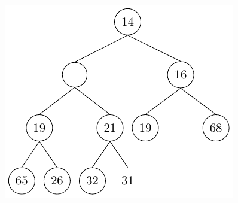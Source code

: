 \begin{center}
\begin{minipage}{0.32\textwidth}
\begin{figure}[H]
\end{figure}
\end{minipage}
\begin{minipage}{0.32\textwidth}
\begin{figure}[H]
  \centering
  \includegraphics[width=\textwidth]{Figure/HeapD3.pdf}
\end{figure}
\end{minipage}
\end{center}
